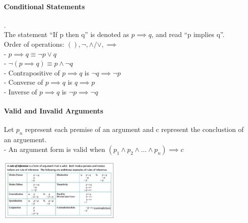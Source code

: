 \documentclass[10pt,letterpaper]{article}
\begin{document}
\begin{multicols}{2}
\paragraph*{Conditional Statements}.\\
The statement ``If p then q'' is denoted as $p \implies q$, and read ``p implies q''.\\
Order of operations: $(), \neg, \land/\lor, \implies$\\
- $p \implies q \equiv \neg p \lor q$\\
- $\neg (p \implies q) \equiv p \land \neg q$\\
- Contrapositive of $p \implies q$ is $\neg q \implies \neg p$\\
- Converse of $p \implies q$ is $q \implies p$\\
- Inverse of $p \implies q$ is $\neg p \implies \neg q$

\paragraph*{Valid and Invalid Arguments} Let $p_n$ represent each premise of an argument and c represent the conclustion of an arguement.\\
- An argument form is valid when $(p_1 \land p_2 \land \dots \land p_n) \implies c$
\begin{center}
    \includegraphics[width=0.45\textwidth]{rule-of-inference.png}
\end{center}


\end{multicols}
\end{document}
